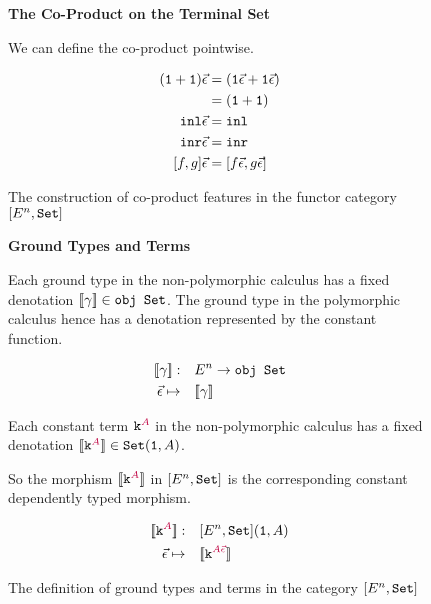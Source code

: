 \documentclass{Report}
\begin{document}
\begin{figure}
    
\begin{framed}
    \centering\textbf{The Co-Product on the Terminal Set}

We can define the co-product pointwise.

\begin{align*}
    (\texttt{1} + \texttt{1})\vec{\epsilon} & = (\texttt{1}\vec{\epsilon} + \texttt{1}\vec{\epsilon})\\
    & = (\texttt{1} + \texttt{1})\\
    \texttt{inl}\vec{\epsilon} &= \texttt{inl}\\
    \texttt{inr}\vec{\epsilon} &= \texttt{inr}\\
    [f, g]\vec{\epsilon} &= [f\vec{\epsilon}, g\vec{\epsilon}]\\
\end{align*}
\end{framed}
\caption{The construction of co-product features in the functor category $[E^n, \texttt{Set}]$}
\label{HowToBuildCoproduct}
\end{figure}

\begin{figure}
    \begin{framed}
        \centering\textbf{Ground Types and Terms}

        Each ground type in the non-polymorphic calculus has a fixed denotation ${\bf [\![}\gamma{\bf ]\!]}\in\texttt{obj }\texttt{Set}$. The ground type in the polymorphic calculus hence has a denotation represented by the constant function.
        
        \begin{align*}
            {\bf [\![}\gamma{\bf ]\!]}:&\quad E^n\rightarrow \texttt{obj }\texttt{Set}\\
            \vec{\epsilon} \mapsto&\quad  {\bf [\![}\gamma{\bf ]\!]}\\
        \end{align*}
        
        Each constant term $\texttt{k}^{\color{purple} A}$ in the non-polymorphic calculus has a fixed denotation ${\bf [\![}\texttt{k}^{\color{purple} A}{\bf ]\!]}\in\texttt{Set}(\texttt{1}, A)$.
        
        So the morphism ${\bf [\![}\texttt{k}^{\color{purple} A}{\bf ]\!]}$ in $[E^n, \texttt{Set}]$ is the corresponding constant dependently typed morphism.
        
        \begin{align*}
            {\bf [\![}\texttt{k}^{\color{purple} A}{\bf ]\!]}:&\quad[E^n, \texttt{Set}](\texttt{1}, A)\\
            \vec{\epsilon}\mapsto&\quad{\bf [\![}\texttt{k}^{\color{purple} A\vec{\epsilon}}{\bf ]\!]}
        \end{align*}        
    \end{framed}
    \caption{The definition of ground types and terms in the category $[E^n, \texttt{Set}]$ }
    \label{HowToBuildGround}
\end{figure}
\end{document}
